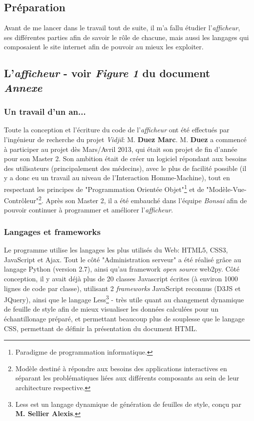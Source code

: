 \documentclass[12pt]{report}
\begin{document}
\begin{spacing}{1.2}
\chapter{Préparation}

Avant de me lancer dans le travail tout de suite, il m'a fallu étudier l'\textit{afficheur}, ses différentes parties afin de savoir le rôle de chacune, mais aussi les langages qui composaient le site internet afin de pouvoir au mieux les exploiter.

\section{L'\textit{afficheur}  - voir \textit{Figure 1} du document \textit{Annexe}}

\subsection{Un travail d'un an...}
Toute la conception et l'écriture du code de l'\textit{afficheur} ont été effectués par l'ingénieur de recherche du projet \textit{Vidjil}: M. \textbf{Duez Marc}.
\newline
M. \textbf{Duez} a commencé à participer au projet dès Mars/Avril 2013, qui était son projet de fin d'année pour son Master 2.
\newline
Son ambition était de créer un logiciel répondant aux besoins des utilisateurs (principalement des médecins), avec le plus de facilité possible (il y a donc eu un travail au niveau de l'Interaction Homme-Machine), tout en respectant les principes de "Programmation Orientée Objet"\footnote{Paradigme de programmation informatique.} et de "Modèle-Vue-Contrôleur"\footnote{Modèle destiné à répondre aux besoins des applications interactives en séparant les problématiques liées aux différents composants au sein de leur architecture respective.}.
\newline
Après son Master 2, il a été embauché dans l'équipe \textit{Bonsai} afin de pouvoir continuer à programmer et améliorer l'\textit{afficheur}.

\subsection{Langages et frameworks}
Le programme utilise les langages les plus utilisés du Web: HTML5, CSS3, JavaScript et Ajax.
\newline
Tout le côté "Administration serveur" a été réalisé grâce au langage Python (version 2.7), ainsi qu'au framework \textit{open source} web2py.
\newline
Côté conception, il y avait déjà plus de 20 classes Javascript écrites (à environ 1000 lignes de code par classe), utilisant 2 \textit{frameworks} JavaScript reconnus (D3JS et JQuery), ainsi que le langage Less\footnote{Less est un langage dynamique de génération de feuilles de style, conçu par \textbf{M. Sellier Alexis}.} - très utile quant au changement dynamique de feuille de style afin de mieux visualiser les données calculées pour un échantillonage préparé, et permettant beaucoup plus de souplesse que le langage CSS, permettant de définir la présentation du document HTML.


\end{spacing}
\end{document}

